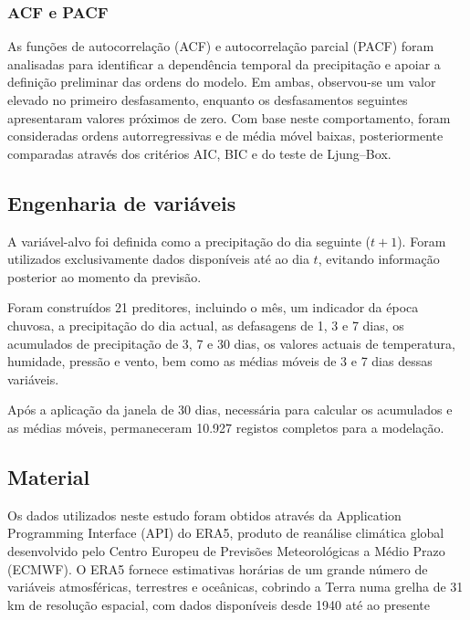 \documentclass[9pt,twocolumn,twoside,english,portuguese]{opticajnl}
\begin{document}
\subsubsection{ACF e PACF}

As funções de autocorrelação (ACF) e autocorrelação parcial (PACF) foram
analisadas para identificar a dependência temporal da precipitação e apoiar a
definição preliminar das ordens do modelo. Em ambas, observou-se um valor
elevado no primeiro desfasamento, enquanto os desfasamentos seguintes
apresentaram valores próximos de zero. Com base neste comportamento, foram
consideradas ordens autorregressivas e de média móvel baixas, posteriormente
comparadas através dos critérios AIC, BIC e do teste de Ljung--Box.

\subsection{Engenharia de variáveis}

A variável-alvo foi definida como a precipitação do dia seguinte ($t+1$).
Foram utilizados exclusivamente dados disponíveis até ao dia $t$, evitando
informação posterior ao momento da previsão.

Foram construídos 21 preditores, incluindo o mês, um indicador da época
chuvosa, a precipitação do dia actual, as defasagens de 1, 3 e 7 dias, os
acumulados de precipitação de 3, 7 e 30 dias, os valores actuais de
temperatura, humidade, pressão e vento, bem como as médias móveis de 3 e 7
dias dessas variáveis.

Após a aplicação da janela de 30 dias, necessária para calcular os acumulados
e as médias móveis, permaneceram 10.927 registos completos para a modelação.

\subsection{Material}
Os dados utilizados neste estudo foram obtidos através da Application Programming Interface (API) do ERA5, produto de reanálise climática global desenvolvido pelo Centro Europeu de Previsões Meteorológicas a Médio Prazo (ECMWF). O ERA5 fornece estimativas horárias de um grande número de variáveis atmosféricas, terrestres e oceânicas, cobrindo a Terra numa grelha de 31 km de resolução espacial, com dados disponíveis desde 1940 até ao presente \cite{hersbach2020}	\paragraph{}
\end{document}

